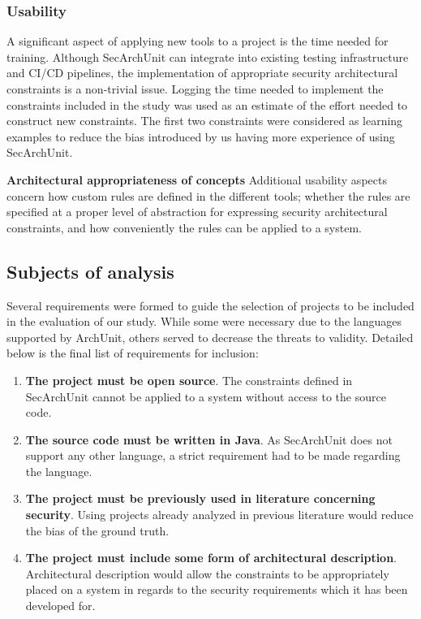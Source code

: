 \subsubsection{Usability}
A significant aspect of applying new tools to a project is the time needed for training. Although SecArchUnit can integrate into existing testing infrastructure and CI/CD pipelines, the implementation of appropriate security architectural constraints is a non-trivial issue. Logging the time needed to implement the constraints included in the study was used as an estimate of the effort needed to construct new constraints. The first two constraints were considered as learning examples to reduce the bias introduced by us having more experience of using SecArchUnit.

\textbf{Architectural appropriateness of concepts}
Additional usability aspects concern how custom rules are defined in the different tools; whether the rules are specified at a proper level of abstraction for expressing security architectural constraints, and how conveniently the rules can be applied to a system.

\subsection{Subjects of analysis} \label{sct:selected-systems}

Several requirements were formed to guide the selection of projects to be included in the evaluation of our study. While some were necessary due to the languages supported by ArchUnit, others served to decrease the threats to validity. Detailed below is the final list of requirements for inclusion:

\begin{enumerate}
    \item \textbf{The project must be open source}. The constraints defined in SecArchUnit cannot be applied to a system without access to the source code.
    \item \textbf{The source code must be written in Java}. As SecArchUnit does not support any other language, a strict requirement had to be made regarding the language. 
    \item \textbf{The project must be previously used in literature concerning security}. Using projects already analyzed in previous literature would reduce the bias of the ground truth. 
    \item \textbf{The project must include some form of architectural description}. Architectural description would allow the constraints to be appropriately placed on a system in regards to the security requirements which it has been developed for.
\end{enumerate}

